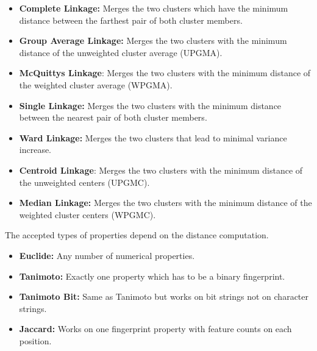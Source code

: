 \begin{itemize}

\item \textbf{Complete Linkage:} Merges the two clusters which have the minimum distance between the farthest pair of both cluster members.
\item \textbf{Group Average Linkage:} Merges the two clusters with the minimum distance of the unweighted cluster average (UPGMA).
\item \textbf{McQuittys Linkage}: Merges the two clusters with the minimum distance of the weighted cluster average (WPGMA).
\item \textbf{Single Linkage:} Merges the two clusters with the minimum distance between the nearest pair of both cluster members.
\item \textbf{Ward Linkage:} Merges the two clusters that lead to minimal variance increase.
\item \textbf{Centroid Linkage}: Merges the two clusters with the minimum distance of the unweighted centers (UPGMC).
\item \textbf{Median Linkage:} Merges the two clusters with the minimum distance of the weighted cluster centers (WPGMC).

\end{itemize}
The accepted types of properties depend on the distance computation.
\begin{itemize}

\item \textbf{Euclide:} Any number of numerical properties.
\item \textbf{Tanimoto:} Exactly one property which has to be a binary fingerprint.
\item \textbf{Tanimoto Bit:} Same as Tanimoto but works on bit strings not on character strings.
\item \textbf{Jaccard:} Works on one fingerprint property with feature counts on each position.
\end{itemize}

